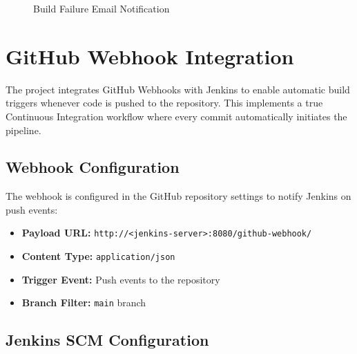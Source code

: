 \documentclass[12pt,a4paper]{article}
\begin{document}
\begin{figure}[H]
    \centering
    \caption{Build Failure Email Notification}
    \label{fig:email-failure}
\end{figure}

\section{GitHub Webhook Integration}

The project integrates GitHub Webhooks with Jenkins to enable automatic build triggers whenever code is pushed to the repository. This implements a true Continuous Integration workflow where every commit automatically initiates the pipeline.

\subsection{Webhook Configuration}

The webhook is configured in the GitHub repository settings to notify Jenkins on push events:

\begin{itemize}
    \item \textbf{Payload URL:} \texttt{http://<jenkins-server>:8080/github-webhook/}
    \item \textbf{Content Type:} \texttt{application/json}
    \item \textbf{Trigger Event:} Push events to the repository
    \item \textbf{Branch Filter:} \texttt{main} branch
\end{itemize}

\subsection{Jenkins SCM Configuration}
\end{document}
